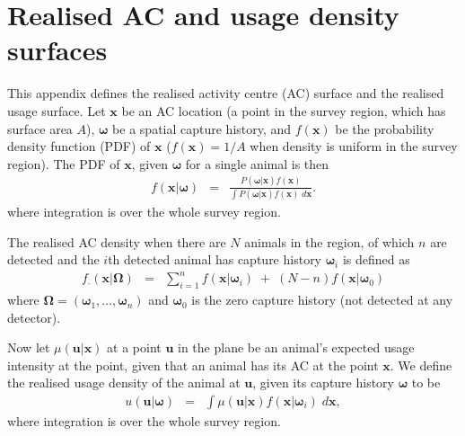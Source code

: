 \documentclass[10pt,a4paper]{article}
\begin{document}




\clearpage
\appendix
\appendixpage
\section{Realised AC and usage density surfaces}
\label{appx:usage-details}

This appendix defines the realised activity centre (AC) surface and the realised usage surface. Let $\bm{x}$ be an AC location (a point in the survey region, which has surface area $A$), $\bm{\omega}$ be a spatial capture history, and $f(\bm{x})$ be the probability density function (PDF) of $\bm{x}$ ($f(\bm{x})=1/A$ when density is uniform in the survey region). The PDF of $\bm{x}$, given $\bm{\omega}$ for a single animal is then
\begin{eqnarray*}
f(\bm{x}|\bm{\omega})&=&\frac{P(\bm{\omega}|\bm{x})f(\bm{x})}{\int P(\bm{\omega}|\bm{x})f(\bm{x})\;d\bm{x}}.
\end{eqnarray*}
\noindent
where integration is over the whole survey region.

The realised AC density when there are $N$ animals in the region, of which $n$ are detected and the $i$th detected animal has capture history $\bm{\omega}_i$ is defined as
\begin{eqnarray*}
f_\cdot(\bm{x}|\bm{\Omega})&=&\sum_{i=1}^nf(\bm{x}|\bm{\omega}_i)\;+\;(N-n)f(\bm{x}|\bm{\omega}_0)
\end{eqnarray*}
\noindent
where $\bm{\Omega}=(\bm{\omega}_1,\ldots,\bm{\omega}_n)$ and $\bm{\omega}_0$ is the zero capture history (not detected at any detector).

Now let $\mu(\bm{u}|\bm{x})$ at a point $\bm{u}$ in the plane be an animal's expected usage intensity at the point, given that an animal has its AC at the point $\bm{x}$.
We define the realised usage density of the animal at $\bm{u}$, given its capture history $\bm{\omega}$ to be 
\begin{eqnarray*}
u(\bm{u}|\bm{\omega})&=&\int \mu(\bm{u}|\bm{x})f(\bm{x}|\bm{\omega}_i)\;d\bm{x},
\end{eqnarray*}
\noindent
where integration is over the whole survey region.
\end{document}
